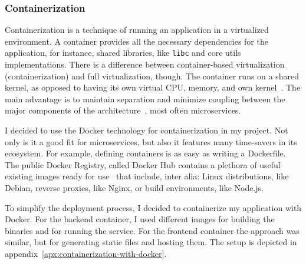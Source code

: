\subsubsection{Containerization}\label{sec:containerization}

Containerization is a technique of running an application
in a virtualized environment.
A container provides all the necessary dependencies
for the application,
for instance, shared libraries,
like \texttt{libc} and core utils implementations.
There is a difference between container-based virtualization
(containerization) and full virtualization, though.
The container runs on a shared kernel,
as opposed to having its own
virtual CPU, memory, and own kernel~\cite{watada_emerging_2019}.
The main advantage is to maintain separation
and minimize coupling between
the major components of the architecture~\cite{stytz_rapid_1997},
most often microservices.

I decided to use the Docker technology
for containerization in my project.
Not only is it a good fit for microservices,
but also it features many time-savers in its ecosystem.
For example,
defining containers
is as easy as writing a Dockerfile.
The public Docker Registry,
called Docker Hub contains a plethora
of useful existing images ready for use~\cite{jaramillo_leveraging_2016}
that include, inter alia:
Linux distributions, like Debian,
reverse proxies, like Nginx,
or build environments, like Node.js.

To simplify the deployment process,
I decided to containerize my application
with Docker.
For the backend container,
I used different images
for building the binaries
and for running the service.
For the frontend container the approach was similar,
but for generating static files
and hosting them.
The setup is depicted in appendix~\ref{apx:containerization-with-docker}.
